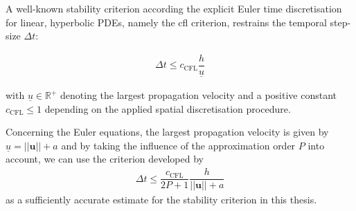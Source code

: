 	
	A well-known stability criterion according the explicit Euler time discretisation for linear, hyperbolic PDEs, namely the \gls{cfl} criterion, restrains the temporal step-size $\Delta t$:
	
	\begin{align}
		\Delta t \leq c_{\text{CFL}} \dfrac{h}{\underline{u}}
	\end{align}
	
	with $\underline{u} \in \mathbb{R}^+$ denoting the largest propagation velocity and a positive constant $c_{\text{CFL}} \leq 1$ depending on the applied spatial discretisation procedure.
	
	Concerning the Euler equations, the largest propagation velocity is given by $\underline{u} = ||\mathbf{u} || + a$ and by taking the influence of the approximation order $P$ into account, we can use the criterion developed by \textcite{cockburn1991runge}
	\begin{align}
		\Delta t \leq \dfrac{c_{\text{CFL}}}{2P+1} \dfrac{h}{||\mathbf{u} || + a}
	\end{align}
	as a sufficiently accurate estimate for the stability criterion in this thesis. 
